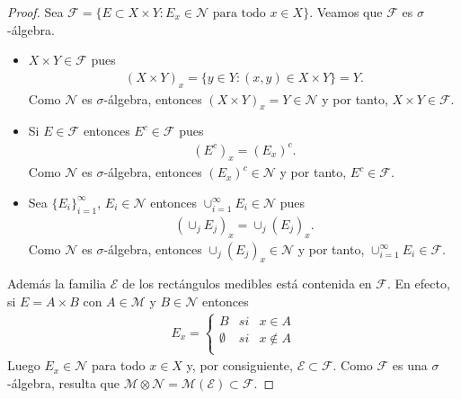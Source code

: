 \begin{proof}
    Sea $\mathcal{F} = \{ E \subset X \times Y : E_x \in \mathcal{N} \text{ para todo } x \in X \}$. Veamos que $\mathcal{F}$ es $\sigma$-álgebra.
    \begin{itemize}
        \item $X \times Y \in \mathcal{F}$ pues
              \begin{align*}
                  (X \times Y)_x = \{ y \in Y : (x,y) \in X \times Y \} = Y.
              \end{align*}
              Como $\mathcal{N}$ es $\sigma$-álgebra, entonces $(X \times Y)_x = Y \in \mathcal{N}$ y por tanto, $X \times Y \in \mathcal{F}$.
        \item Si $E \in \mathcal{F}$ entonces $E^c \in \mathcal{F}$ pues
              \begin{align*}
                  (E^c)_x = (E_x)^c.
              \end{align*}
              Como $\mathcal{N}$ es $\sigma$-álgebra, entonces $(E_x)^c \in \mathcal{N}$ y por tanto, $E^c \in \mathcal{F}$.
        \item Sea $\{E_i\}_{i=1}^{\infty}$, $E_i \in \mathcal{N}$ entonces $\cup_{i=1}^{\infty}{E_i} \in \mathcal{N}$ pues
              \begin{align*}
                  (\cup_j E_j)_x = \cup_j (E_j)_x.
              \end{align*}
              Como $\mathcal{N}$ es $\sigma$-álgebra, entonces $\cup_j (E_j)_x \in \mathcal{N}$ y por tanto, $\cup_{i=1}^{\infty}{E_i} \in \mathcal{F}$.
    \end{itemize}
    Además la familia $\mathcal{E}$ de los rectángulos medibles está contenida en $\mathcal{F}$. En efecto, si $E = A \times B$ con $A \in \mathcal{M}$ y $B \in \mathcal{N}$ entonces
    \begin{align*}
        E_x = \left\{ \begin{array}{lcc}
                          B         & si & x \in A      \\
                          \emptyset & si & x \not \in A \\
                      \end{array}
        \right.
    \end{align*}
    Luego $E_x \in \mathcal{N}$ para todo $x \in X$ y, por consiguiente, $\mathcal{E} \subset \mathcal{F}$. Como $\mathcal{F}$ es una $\sigma$-álgebra, resulta que $\mathcal{M} \otimes \mathcal{N} = \mathcal{M}(\mathcal{E}) \subset \mathcal{F}$.
\end{proof}

